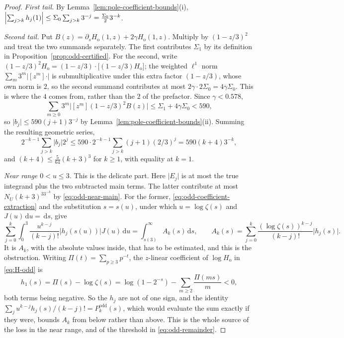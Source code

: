 \documentclass[11pt]{amsart}
\theoremstyle{plain}
\theoremstyle{definition}
\newcommand{\dd}{\,\mathrm d}
\newcommand{\abs}[1]{\lvert #1\rvert}
\begin{document}
\begin{proof}
\emph{First tail.} By Lemma~\ref{lem:pole-coefficient-bounds}(i),
$\Bigl\lvert\sum_{j>k}h_j(1)\Bigr\rvert\leq\Sigma_0\sum_{j>k}3^{-j}=\frac{\Sigma_0}{2}3^{-k}$.

\emph{Second tail.} Put
$B(z)=\partial_sH_{\mathrm o}(1,z)+2\gamma H_{\mathrm o}(1,z)$. Multiply by
$(1-z/3)^2$ and treat the two summands separately. The first contributes
$\Sigma_1$ by its definition in Proposition~\ref{prop:odd-certified}. For the
second, write
$(1-z/3)^2H_{\mathrm o}=(1-z/3)\cdot\bigl[(1-z/3)H_{\mathrm o}\bigr]$; the
weighted $\ell^1$ norm $\sum_m3^m\abs{[z^m]\cdot}$ is submultiplicative under
this extra factor $(1-z/3)$, whose own norm is $2$, so the second summand
contributes at most $2\gamma\cdot2\Sigma_0=4\gamma\Sigma_0$. This is where
the $4$ comes from, rather than the $2$ of the prefactor. Since $\gamma<0.578$,
\[
 \sum_{m\geq0}3^m\abs{[z^m](1-z/3)^2B(z)}\leq\Sigma_1+4\gamma\Sigma_0<590,
\]
so $\abs{b_j}\leq590(j+1)3^{-j}$ by Lemma~\ref{lem:pole-coefficient-bounds}(ii).
Summing the resulting geometric series,
\[
 2^{-k-1}\sum_{j>k}\abs{b_j}2^j
 \leq590\cdot2^{-k-1}\sum_{j>k}(j+1)(2/3)^j
 =590(k+4)3^{-k},
\]
and $(k+4)\leq\frac{5}{64}(k+3)^3$ for $k\geq1$, with equality at $k=1$.

\emph{Near range $0<u\leq3$.} This is the delicate part. Here $\abs{E_j}$ is
at most the true integrand plus the two subtracted main terms. The latter
contribute at most
$N_U(k+3)^33^{-k}$ by \eqref{eq:odd-near-main}. For the former,
\eqref{eq:odd-coefficient-extraction} and the substitution $s=s(u)$, under
which $u=\log\zeta(s)$ and $J(u)\dd u=\dd s$, give
\begin{equation}\label{eq:odd-Ak-def}
 \sum_{j=0}^k\int_0^3\frac{u^{k-j}}{(k-j)!}\abs{h_j(s(u))}J(u)\dd u
 =\int_{s(3)}^\infty A_k(s)\dd s,
 \qquad
 A_k(s)=\sum_{j=0}^k\frac{(\log\zeta(s))^{k-j}}{(k-j)!}\abs{h_j(s)}.
\end{equation}
It is $A_k$, with the absolute values inside, that has to be estimated, and
this is the obstruction. Writing
$\Pi(t)=\sum_{p\geq3}p^{-t}$, the $z$-linear coefficient of
$\log H_{\mathrm o}$ in \eqref{eq:H-odd} is
\begin{equation}\label{eq:odd-h1-negative}
 h_1(s)=\Pi(s)-\log\zeta(s)
 =\log(1-2^{-s})-\sum_{m\geq2}\frac{\Pi(ms)}{m}<0,
\end{equation}
both terms being negative. So the $h_j$ are not of one sign, and the identity
$\sum_j u^{k-j}h_j(s)/(k-j)!=P_k^{\mathrm{odd}}(s)$, which would evaluate the
sum exactly if they were, bounds $A_k$ from below rather than above. This is
the whole source of the loss in the near range, and of the threshold in
\eqref{eq:odd-remainder}.


\end{proof}
\end{document}
